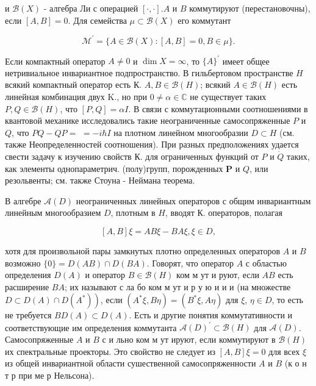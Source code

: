 \documentclass[10pt]{article}
\begin{document}
и $\mathscr{B}(X)$ - алгебра Ли с операцией $[\cdot, \cdot] . A$ и $B$ коммутируют (перестановочны), если $[A, B]=0$. Для семейства $\mathscr{\mu} \subset \mathscr{B}(X)$ его коммутант



\[

\mathscr{M}^{\prime}=\{A \in \mathscr{B}(X):[A, B]=0, B \in \mathscr{\mu}\} .

\]



Если компактный оператор $A \neq 0$ и $\operatorname{dim} X=\infty$, то $\{A\}^{\prime}$ имеет общее нетривиальное инвариантное подпространство. В гильбертовом пространстве $H$ всякий компактный оператор есть К. $A, B \in \mathscr{B}(H)$; всякий $A \in \mathscr{B}(H)$ есть линейная комбинация двух K., но при $0 \neq \alpha \in \mathbb{C}$ не существует таких $P, Q \in \mathscr{B}(H)$, что $[P, Q]=\alpha I$. В связи с коммутационными соотношениями в квантовой механике исследовались такие неограниченные самосопряженные $P$ и $Q$, что $P Q-Q P=$ $=-i \hbar I$ на плотном линейном многообразии $D \subset H$ (см. также Неопределенностей соотношения). При разных предположениях удается свести задачу к изучению свойств К. для ограниченных функций от $P$ и $\dot{Q}$ таких, как элементы однопараметрич. (полу)групп, порожденных $\boldsymbol{P}$ и $Q$, или резольвенты; см. также Стоуна - Неймана теорема.



В алгебре $\mathscr{A}(D)$ неограниченных линейных операторов с общим инвариантным линейным многообразием $D$, плотным в $H$, вводят К. операторов, полагая



\[

[A, B] \xi=A B \xi-B A \xi, \xi \in D,

\]



хотя для произвольной пары замкнутых плотно определенных операторов $A$ и $B$ возможно $\{0\}=D(A B) \cap D(B A)$. Говорят, что оператор $A$ с областью определения $D(A)$ и оператор $B \in \mathscr{B}(H)$ ком м ут и руют, если $A B$ есть расширение $B A$; их называют с ла бо ком м ут и р у ю и и и (на множестве $\left.D \subset D(A) \cap D\left(A^{*}\right)\right)$, если $\left(A^{*} \xi, B \eta\right)=\left(B^{*} \xi, A \eta\right)$ для $\xi$, $\eta \in D$, то есть не требуется $B D(A) \subset D(A)$. Есть и другие понятия коммутативности и соответствующие им определения коммутанта $\mathscr{A}(D)^{\prime} \subset \mathscr{B}(H)$ для $\mathscr{A}(D)$. Самосопряженные $A$ и $B$ с и льно ком м ут ируют, если коммутируют в $\mathscr{B}(H)$ их спектральные проекторы. Это свойство не следует из $[A, B] \xi=0$ для всех $\xi$ из общей инвариантной области сушественной самосопряженности $A$ и $B$ (к о н т р при ме р Нельсона).
\end{document}
